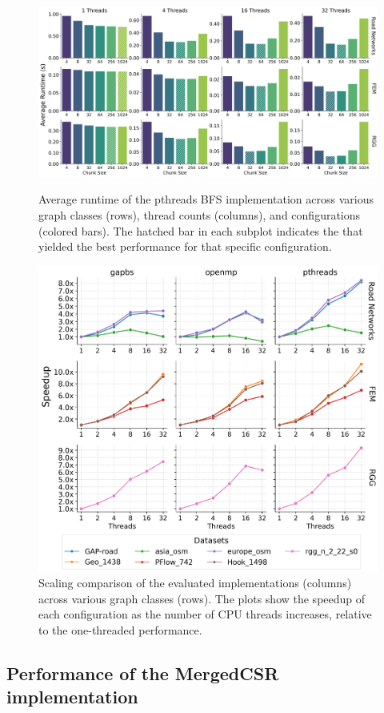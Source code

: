\begin{figure}[h]
\centering
\includegraphics[width=\linewidth]{images/pthreads_chunksize.png}
\caption{Average runtime of the pthreads BFS implementation across various graph classes (rows), thread counts (columns), and \chunksize{} configurations (colored bars). The hatched bar in each subplot indicates the \chunksize{} that yielded the best performance for that specific configuration.}
\label{fig:chunksize}

\includegraphics[width=0.8\linewidth]{images/scalability.png}
\caption{Scaling comparison of the evaluated implementations (columns) across various graph classes (rows). The plots show the speedup of each configuration as the number of CPU threads increases, relative to the one-threaded performance.}
\label{fig:scaling_comparison}
\end{figure}

\clearpage

\subsection{Performance of the MergedCSR implementation}
\label{sec:mergedcsrperf}


